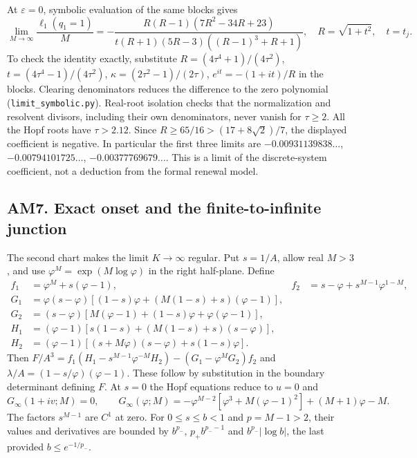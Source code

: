 At $\varepsilon=0$, symbolic evaluation of the same blocks gives
\[
 \lim_{M\to\infty}\frac{\ell_1(q_1=1)}M
 =-\frac{R(R-1)(7R^2-34R+23)}{t(R+1)(5R-3)((R-1)^3+R+1)},\quad
 R=\sqrt{1+t^2},\quad t=t_j.
\]
To check the identity exactly, substitute
$R=(4\tau^4+1)/(4\tau^2)$, $t=(4\tau^4-1)/(4\tau^2)$,
$\kappa=(2\tau^2-1)/(2\tau)$, $e^{it}=-(1+it)/R$ in the blocks.
Clearing denominators reduces the difference to the zero polynomial
(\texttt{limit\_symbolic.py}). Real-root isolation checks that the normalization and
resolvent divisors, including their own denominators, never vanish for $\tau\ge2$.
All the Hopf roots have $\tau>2.12$. Since $R\ge65/16>(17+8\sqrt2)/7$,
the displayed coefficient is negative. In particular the first three limits are
$-0.00931139838\ldots$, $-0.00794101725\ldots$, $-0.00377769679\ldots$.
This is a limit of the discrete-system coefficient, not a deduction from the formal renewal model.

\subsection{AM7. Exact onset and the finite-to-infinite junction}
The second chart makes the limit $K\to\infty$ regular. Put $s=1/A$, allow real $M>3$,
and use $\varphi^M=\exp(M\log\varphi)$ in the right half-plane. Define
\begin{align*}
 f_1&=\varphi^M+s(\varphi-1),&f_2&=s-\varphi+s^{M-1}\varphi^{1-M},\\
 G_1&=\varphi(s-\varphi)[(1-s)\varphi+(M(1-s)+s)(\varphi-1)],\\
 G_2&=(s-\varphi)[M(\varphi-1)+(1-s)\varphi+\varphi(\varphi-1)],\\
 H_1&=(\varphi-1)[s(1-s)+(M(1-s)+s)(s-\varphi)],\\
 H_2&=(\varphi-1)[(s+M\varphi)(s-\varphi)+s(1-s)\varphi].
\end{align*}
Then $F/A^3=f_1(H_1-s^{M-1}\varphi^{-M}H_2)-(G_1-\varphi^MG_2)f_2$ and
$\lambda/A=(1-s/\varphi)(\varphi-1)$. These follow by substitution in the
boundary determinant defining $F$. At $s=0$ the Hopf equations reduce to $u=0$ and
\[
 G_\infty(1+iv;M)=0,\qquad
 G_\infty(\varphi;M)=-\varphi^{M-2}[\varphi^3+M(\varphi-1)^2]+(M+1)\varphi-M.
\]
The factors $s^{M-1}$ are $C^1$ at zero. For $0\le s\le b<1$ and $p=M-1>2$,
their values and derivatives are bounded by $b^{p_-}$, $p_+b^{p_--1}$ and
$b^{p_-}|\log b|$, the last provided $b\le e^{-1/p_-}$.

